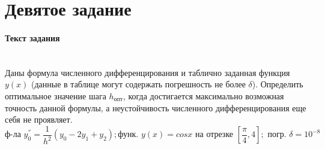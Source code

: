 \maketitle
\tableofcontents
\newpage

\section{Девятое задание}
\paragraph{Текст задания} ~\\
Даны формула численного дифференцирования и таблично заданная функция $y(x)$ (данные в таблице могут содержать погрешность не более $\delta$). Определить оптимальное значение шага $h_{\text{опт}}$, когда достигается максимально возможная точность данной формулы, а неустойчивость численного дифференцирования еще себя не проявляет.\\[2mm]
\[
  \text{ф-ла } y_{0}^{''} = \frac{1}{h^{2}} (y_{0} - 2y_{1} + y_{2}); \text{функ. } y(x) = cos x \text{ на отрезке } \left[ \frac{\pi}{4}, 4 \right]; \text{ погр. } \delta = 10^{-8}
\]

